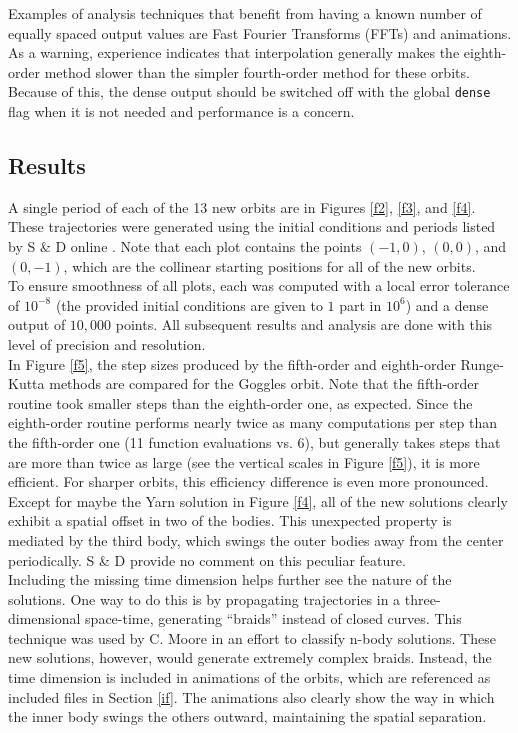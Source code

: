 \documentclass[12pt]{article}
\begin{document}
Examples of analysis techniques that benefit from having a known number of equally spaced output values are Fast Fourier Transforms (FFTs) and animations. As a warning, experience indicates that interpolation generally makes the eighth-order method slower than the simpler fourth-order method for these orbits. Because of this, the dense output should be switched off with the global \texttt{dense} flag when it is not needed and performance is a concern.
\subsection{Results}
\label{results}
A single period of each of the 13 new orbits are in Figures \ref{f2}, \ref{f3}, and \ref{f4}. These trajectories were generated using the initial conditions and periods listed by S \& D online \cite{3bsite}. Note that each plot contains the points $(-1, 0)$, $(0, 0)$, and $(0, -1)$, which are the collinear starting positions for all of the new orbits. \\

To ensure smoothness of all plots, each was computed with a local error tolerance of $10^{-8}$ (the provided initial conditions are given to $1$ part in $10^{6}$) and a dense output of $10,000$ points. All subsequent results and analysis are done with this level of precision and resolution.\\

In Figure \ref{f5}, the step sizes produced by the fifth-order and eighth-order Runge-Kutta methods are compared for the Goggles orbit. Note that the fifth-order routine took smaller steps than the eighth-order one, as expected. Since the eighth-order routine performs nearly twice as many computations per step than the fifth-order one (11 function evaluations vs. 6), but generally takes steps that are more than twice as large (see the vertical scales in Figure \ref{f5}), it is more efficient. For sharper orbits, this efficiency difference is even more pronounced. \\

Except for maybe the Yarn solution in Figure \ref{f4}, all of the new solutions clearly exhibit a spatial offset in two of the bodies. This unexpected property is mediated by the third body, which swings the outer bodies away from the center periodically. S \& D provide no comment on this peculiar feature. \\

Including the missing time dimension helps further see the nature of the solutions. One way to do this is by propagating trajectories in a three-dimensional space-time, generating ``braids'' instead of closed curves. This technique was used by C. Moore \cite{braids} in an effort to classify n-body solutions. These new solutions, however, would generate extremely complex braids. Instead, the time dimension is included in animations of the orbits, which are referenced as included files in Section \ref{if}. The animations also clearly show the way in which the inner body swings the others outward, maintaining the spatial separation.
\end{document}
